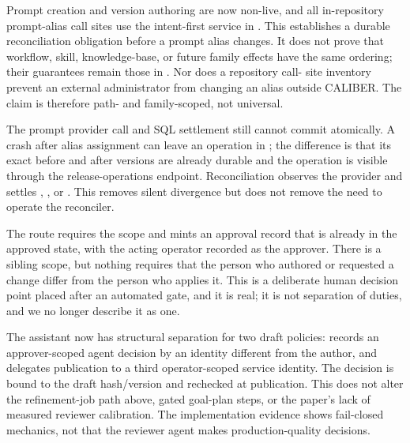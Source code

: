  Prompt creation and
version authoring are now non-live, and all in-repository prompt-alias call sites
use the intent-first service in . This establishes a durable
reconciliation obligation before a prompt alias changes. It does not prove that
workflow, skill, knowledge-base, or future family effects have the same ordering;
their guarantees remain those in . Nor does a repository call-
site inventory prevent an external administrator from changing an \mlflow{} alias
outside CALIBER. The claim is therefore path- and family-scoped, not universal.

 The prompt provider call and
SQL settlement still cannot commit atomically. A crash after alias assignment can
leave an operation in ; the difference is that its exact before and
after versions are already durable and the operation is visible through the
release-operations endpoint. Reconciliation observes the provider and settles
, , or . This removes silent
divergence but does not remove the need to operate the reconciler.

 The
route requires the \operator{} scope and mints an approval record that is already
in the approved state, with the acting operator recorded as the approver. There is
a sibling \approver{} scope, but nothing requires that the person who authored or
requested a change differ from the person who applies it. This is a deliberate
human decision point placed after an automated gate, and it is real; it is not
separation of duties, and we no longer describe it as one.

 The assistant now has structural separation for two draft policies:
 records an approver-scoped agent decision by an identity
different from the author, and  delegates publication to a
third operator-scoped service identity. The decision is bound to the draft
hash/version and rechecked at publication. This does not alter the refinement-job
 path above, gated goal-plan steps, or the paper's lack of measured
reviewer calibration. The implementation evidence shows fail-closed mechanics, not
that the reviewer agent makes production-quality decisions.

